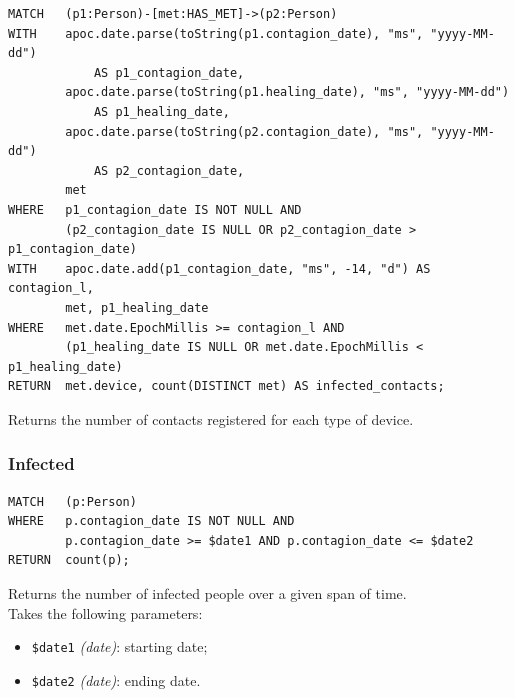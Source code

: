 \documentclass[12pt, a4paper]{article}
\begin{document}
\begin{tcolorbox}[fontupper=\scriptsize]
    \begin{verbatim}
MATCH   (p1:Person)-[met:HAS_MET]->(p2:Person)
WITH    apoc.date.parse(toString(p1.contagion_date), "ms", "yyyy-MM-dd") 
            AS p1_contagion_date,
        apoc.date.parse(toString(p1.healing_date), "ms", "yyyy-MM-dd") 
            AS p1_healing_date,
        apoc.date.parse(toString(p2.contagion_date), "ms", "yyyy-MM-dd") 
            AS p2_contagion_date,
        met
WHERE   p1_contagion_date IS NOT NULL AND
        (p2_contagion_date IS NULL OR p2_contagion_date > p1_contagion_date)
WITH    apoc.date.add(p1_contagion_date, "ms", -14, "d") AS contagion_l,
        met, p1_healing_date
WHERE   met.date.EpochMillis >= contagion_l AND
        (p1_healing_date IS NULL OR met.date.EpochMillis < p1_healing_date)
RETURN  met.device, count(DISTINCT met) AS infected_contacts;
    \end{verbatim}
\end{tcolorbox}

\noindent %
Returns the number of contacts registered for each type of device.

\subsubsection{Infected}
\begin{tcolorbox}[fontupper=\scriptsize]
    \begin{verbatim}
MATCH   (p:Person)
WHERE   p.contagion_date IS NOT NULL AND
        p.contagion_date >= $date1 AND p.contagion_date <= $date2
RETURN  count(p);
    \end{verbatim}
\end{tcolorbox}

\noindent %
Returns the number of infected people over a given span of time. \\
Takes the following parameters: 
\begin{itemize}
    \item \texttt{\$date1} \emph{(date)}: starting date;
    \item \texttt{\$date2} \emph{(date)}: ending date.
\end{itemize}
\end{document}

